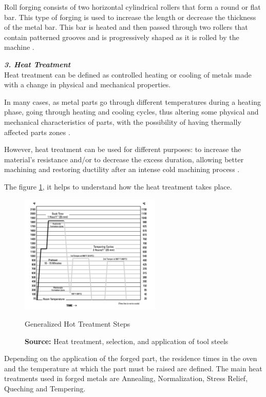 Roll forging consists of two horizontal cylindrical rollers that form a round or flat bar. This type of forging is used to increase the length or decrease the thickness of the metal bar. This bar is heated and then passed through two rollers that contain patterned grooves and is progressively shaped as it is rolled by the machine \cite{site3}.\par
\vspace{20}
\textbf{ \emph{3. Heat Treatment}}\\

Heat treatment can be defined as controlled heating or cooling of metals made with a change in physical and mechanical properties.\par
In many cases, as metal parts go through different temperatures during a heating phase, going through heating and cooling cycles, thus altering some physical and mechanical characteristics of parts, with the possibility of having thermally affected parts zones \cite{bryson2005heat,souza2015estudo}. \par
However, heat treatment can be used for different purposes: to increase the material's resistance and/or to decrease the excess duration, allowing better machining and restoring ductility after an intense cold machining process \cite{bryson2005heat,souza2015estudo}. \par
The figure \ref{HTsteps}, it helps to understand how the heat treatment takes place.

\begin{figure}[h]
\centering
\includegraphics[width=0.6\textwidth]{./Images/HotTreat.png}
\caption{Generalized Hot Treatment Steps}
\label{HTsteps}
\caption*{\textbf{Source:} Heat treatment, selection, and application of tool steels \cite{bryson2005heat}}
\end{figure}

Depending on the application of the forged part, the residence times in the oven and the temperature at which the part must be raised are defined.
The main heat treatments used in forged metals are Annealing, Normalization, Stress Relief, Queching and Tempering.

